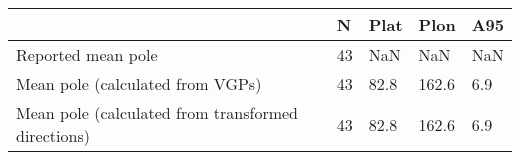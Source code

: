 \begin{tabular}{lllll}
\toprule
{} &   N &  Plat &   Plon &  A95 \\
\midrule
Reported mean pole                                 &  43 &   NaN &    NaN &  NaN \\
Mean pole (calculated from VGPs)                   &  43 &  82.8 &  162.6 &  6.9 \\
Mean pole (calculated from transformed directions) &  43 &  82.8 &  162.6 &  6.9 \\
\bottomrule
\end{tabular}
